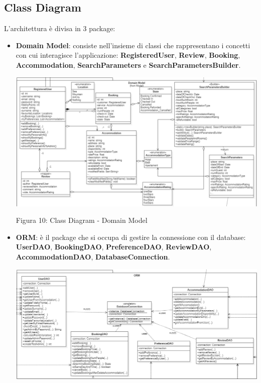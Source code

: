 \documentclass[10pt]{article}
\begin{document}
\subsection{Class Diagram}
L'architettura è divisa in 3 package:
\begin{itemize}
\label{domainmodel}
\item \textbf{Domain Model}: consiste nell’insieme di classi che rappresentano i concetti con cui interagisce l’applicazione: \textbf{RegisteredUser}, \textbf{Review}, \textbf{Booking}, \textbf{Accommodation}, \textbf{SearchParameters} e \textbf{SearchParametersBuilder}.
\par\medskip
\hspace*{-2cm}
\includegraphics[scale=0.58]{uml/DomainModel}
\par\medskip
\begin{center}
Figura 10: Class Diagram - Domain Model 
\end{center}
\par\medskip
\vspace{-0.3cm}
\item \textbf{ORM}: è il package che si occupa di gestire la connessione con il database: \textbf{UserDAO}, \textbf{BookingDAO}, \textbf{PreferenceDAO}, \textbf{ReviewDAO}, \textbf{AccommodationDAO}, \textbf{DatabaseConnection}.
\par\medskip
\hspace*{-1.75cm}
\includegraphics[scale=0.58]{uml/DAO}

\end{itemize}
\end{document}
